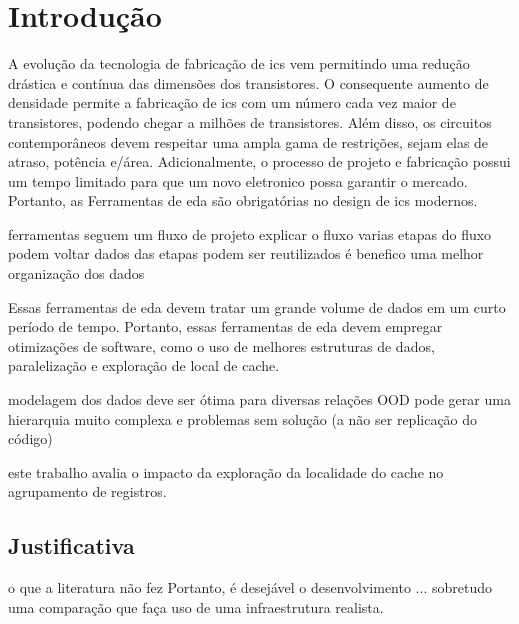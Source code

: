 \chapter{Introdução}
\label{cap:introducao}

A evolução da tecnologia de fabricação de \acp{ic} vem permitindo uma redução drástica e contínua das dimensões dos transistores.
O consequente aumento de densidade permite a fabricação de \acp{ic} com um número cada vez maior de transistores, podendo chegar a milhões de transistores.
Além disso, os circuitos contemporâneos devem respeitar uma ampla gama de restrições, sejam elas de atraso, potência e\@/\@ou área.
Adicionalmente, o processo de projeto e fabricação possui um tempo limitado para que um novo eletronico possa garantir o mercado.
Portanto, as Ferramentas de \ac{eda} são obrigatórias no design de \acp{ic} modernos.




ferramentas seguem um fluxo de projeto
explicar o fluxo
varias etapas do fluxo podem voltar
dados das etapas podem ser reutilizados
é benefico uma melhor organização dos dados


Essas ferramentas de \ac{eda} devem tratar um grande volume de dados em um curto período de tempo. Portanto, essas ferramentas de \ac{eda} devem empregar otimizações de software, como o uso de melhores estruturas de dados, paralelização e exploração de local de cache.

modelagem dos dados deve ser ótima para diversas relações
OOD pode gerar uma hierarquia muito complexa e problemas sem solução (a não ser replicação do código)








este trabalho avalia o impacto da exploração da localidade do cache no agrupamento de registros.


\section{Justificativa}
    o que a literatura não fez
    Portanto, é desejável o desenvolvimento ... sobretudo uma comparação que faça uso de uma infraestrutura realista.

